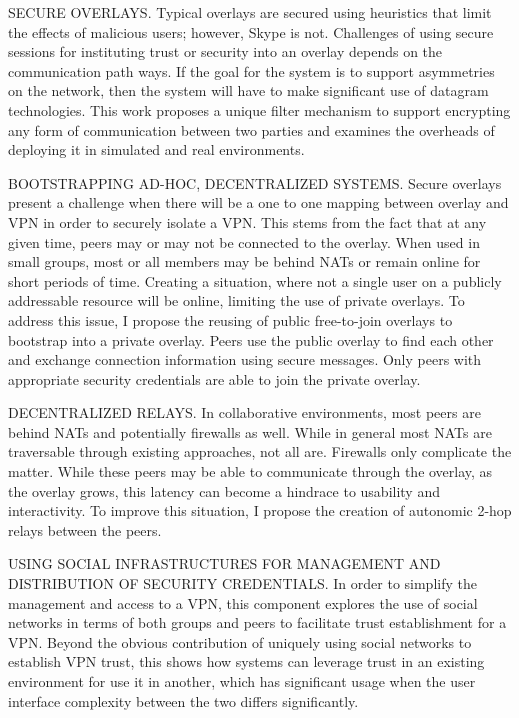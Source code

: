 SECURE OVERLAYS. Typical overlays are secured using heuristics that limit the
effects of malicious users; however, Skype is not.  Challenges of using secure
sessions for instituting trust or security into an overlay depends on the
communication path ways.  If the goal for the system is to support asymmetries
on the network, then the system will have to make significant use of datagram
technologies.  This work proposes a unique filter mechanism to support
encrypting any form of communication between two parties and examines the
overheads of deploying it in simulated and real environments.

BOOTSTRAPPING AD-HOC, DECENTRALIZED SYSTEMS. Secure overlays present a
challenge when there will be a one to one mapping between overlay and VPN in
order to securely isolate a VPN.  This stems from the fact that at any given
time, peers may or may not be connected to the overlay.  When used in small
groups, most or all members may be behind NATs or remain online for short
periods of time.  Creating a situation, where not a single user on a publicly
addressable resource will be online, limiting the use of private overlays.  To
address this issue, I propose the reusing of public free-to-join overlays to
bootstrap into a private overlay.  Peers use the public overlay to find each
other and exchange connection information using secure messages.  Only peers
with appropriate security credentials are able to join the private overlay.

DECENTRALIZED RELAYS. In collaborative environments, most peers are behind NATs
and potentially firewalls as well.  While in general most NATs are traversable
through existing approaches, not all are.  Firewalls only complicate the
matter.  While these peers may be able to communicate through the overlay, as
the overlay grows, this latency can become a hindrace to usability and
interactivity.  To improve this situation, I propose the creation of autonomic
2-hop relays between the peers.

USING SOCIAL INFRASTRUCTURES FOR MANAGEMENT AND DISTRIBUTION OF SECURITY
CREDENTIALS. In order to simplify the management and access to a VPN, this
component explores the use of social networks in terms of both groups and peers
to facilitate trust establishment for a VPN.  Beyond the obvious contribution
of uniquely using social networks to establish VPN trust, this shows how
systems can leverage trust in an existing environment for use it in another,
which has significant usage when the user interface complexity between the two
differs significantly.

